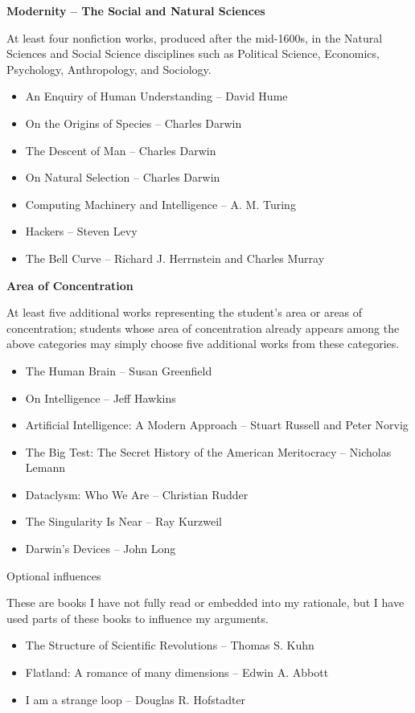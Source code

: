 \documentclass[11pt]{article}
\begin{document}
\par \textbf{Modernity -- The Social and Natural Sciences}
\par At least four nonfiction works, produced after the mid-1600s, in the Natural Sciences and Social Science disciplines such as Political Science, Economics, Psychology, Anthropology, and Sociology.
\begin{itemize}
	\item An Enquiry of Human Understanding -- David Hume
	\item On the Origins of Species -- Charles Darwin
	\item The Descent of Man -- Charles Darwin
	\item On Natural Selection -- Charles Darwin
	\item Computing Machinery and Intelligence -- A. M. Turing
	\item Hackers -- Steven Levy
	\item The Bell Curve -- Richard J. Herrnstein and Charles Murray
\end{itemize}

\par \textbf{Area of Concentration}
\par At least five additional works representing the student's area or areas of concentration; students whose area of concentration already appears among the above categories may simply choose five additional works from these categories.
\begin{itemize}
	\item The Human Brain -- Susan Greenfield
	\item On Intelligence -- Jeff Hawkins
	\item Artificial Intelligence: A Modern Approach -- Stuart Russell and Peter Norvig
	\item The Big Test: The Secret History of the American Meritocracy -- Nicholas Lemann
	\item Dataclysm: Who We Are -- Christian Rudder
	\item The Singularity Is Near -- Ray Kurzweil
	\item Darwin's Devices -- John Long
\end{itemize}

{\Large Optional influences\\\par}
\par These are books I have not fully read or embedded into my rationale, but I have used parts of these books to influence my arguments.
\begin{itemize}
	\item The Structure of Scientific Revolutions -- Thomas S. Kuhn
	\item Flatland: A romance of many dimensions -- Edwin A. Abbott
	\item I am a strange loop -- Douglas R. Hofstadter
\end{itemize}
\end{document}
